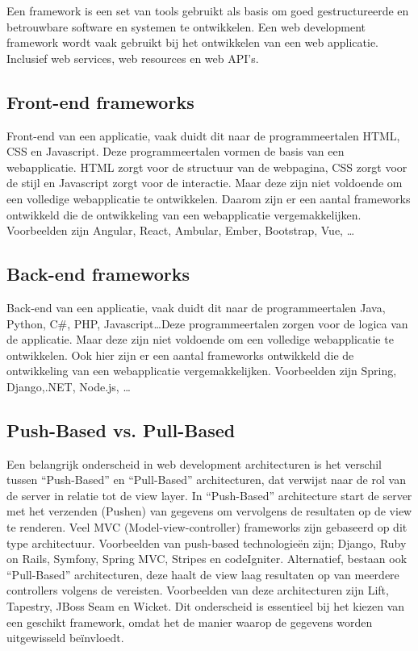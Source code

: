 Een framework is een set van tools gebruikt als basis om goed gestructureerde
en betrouwbare software en systemen te ontwikkelen. Een web development
framework wordt vaak gebruikt bij het ontwikkelen van een web applicatie.
Inclusief web services, web resources en web API's.

\subsection{Front-end frameworks}%
\label{sub:frontend_frameworks}
Front-end van een applicatie, vaak duidt dit naar de programmeertalen HTML, CSS en Ja\-va\-script. Deze programmeertalen vormen de basis van een webapplicatie. HTML zorgt voor de structuur van de webpagina, CSS zorgt voor de stijl en Ja\-va\-script zorgt voor de interactie. Maar deze zijn niet voldoende om een volledige webapplicatie te ontwikkelen. Daarom zijn er een aantal frameworks ontwikkeld die de ontwikkeling van een webapplicatie vergemakkelijken.
Voorbeelden zijn Angular, React, Ambular, Ember, Bootstrap, Vue, \ldots\autocite{Jaiswal2022}

\subsection{Back-end frameworks}%
\label{sub:backend_frameworks}
Back-end van een applicatie, vaak duidt dit naar de programmeertalen Java, Python, C\#, PHP, Ja\-va\-script\ldots  Deze programmeertalen zorgen voor de logica van de applicatie. Maar deze zijn niet voldoende om een volledige webapplicatie te ontwikkelen. Ook hier zijn er een aantal frameworks ontwikkeld die de ontwikkeling van een webapplicatie vergemakkelijken.
Voorbeelden zijn Spring, Django,.NET, Node.js, \ldots\autocite{Kaluza2019}

\subsection{Push-Based vs. Pull-Based}%
Een belangrijk onderscheid in web development architecturen is het verschil
tussen ``Push-Based'' en ``Pull-Based'' architecturen, dat verwijst naar de rol
van de server in relatie tot de view layer.\autocite{Lomas2022} \bigbreak In
``Push-Based'' architecture start de server met het verzenden (Pushen) van
gegevens om vervolgens de resultaten op de view te renderen. Veel MVC
(Model-view-controller) frameworks zijn gebaseerd op dit type architectuur.
Voorbeelden van push-based technologieën zijn; Django, Ruby on Rails, Symfony,
Spring MVC, Stripes en codeIgniter. \bigbreak Alternatief, bestaan ook
``Pull-Based'' architecturen, deze haalt de view laag resultaten op van
meerdere controllers volgens de vereisten. Voorbeelden van deze architecturen
zijn Lift, Tapestry, JBoss Seam en Wicket. \bigbreak Dit onderscheid is
essentieel bij het kiezen van een geschikt framework, omdat het de manier
waarop de gegevens worden uitgewisseld beïnvloedt.

